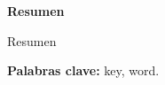
\begin{center}
\textbf{\large Resumen}
\end{center}

Resumen

\vfill
\textbf{Palabras clave:} key, word.

